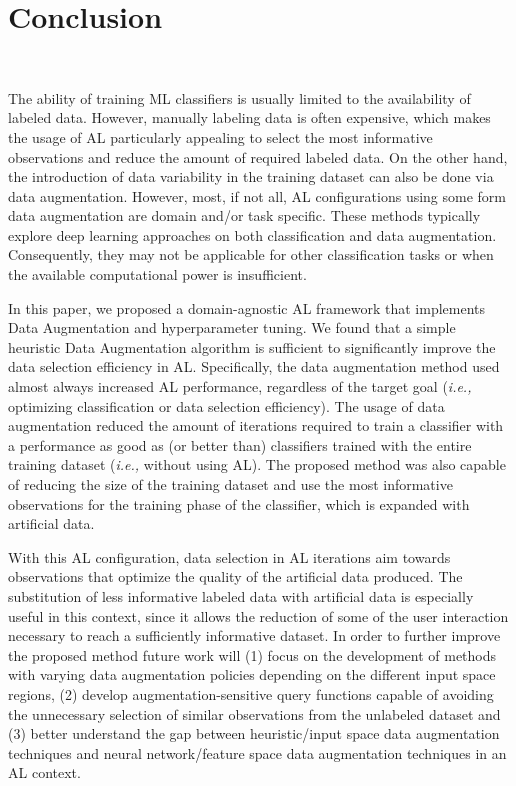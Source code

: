 \documentclass[parskip=full]{scrartcl}
\begin{document}
\section{Conclusion}~\label{sec:conclusion}

The ability of training ML classifiers is usually limited to the availability
of labeled data. However, manually labeling data is often expensive, which
makes the usage of AL particularly appealing to select the most informative
observations and reduce the amount of required labeled data. On the other
hand, the introduction of data variability in the training dataset can also be
done via data augmentation. However, most, if not all, AL configurations using
some form data augmentation are domain and/or task specific. These methods
typically explore deep learning approaches on both classification and data
augmentation. Consequently, they may not be applicable for other
classification tasks or when the available computational power is
insufficient.

In this paper, we proposed a domain-agnostic AL framework that implements Data
Augmentation and hyperparameter tuning. We found that a simple heuristic Data
Augmentation algorithm is sufficient to significantly improve the data
selection efficiency in AL\@. Specifically, the data augmentation method used
almost always increased AL performance, regardless of the target goal
(\textit{i.e.,} optimizing classification or data selection efficiency). The
usage of data augmentation reduced the amount of iterations required to train
a classifier with a performance as good as (or better than) classifiers
trained with the entire training dataset (\textit{i.e.,} without using AL).
The proposed method was also capable of reducing the size of the training
dataset and use the most informative observations for the training phase of
the classifier, which is expanded with artificial data. 

With this AL configuration, data selection in AL iterations aim towards
observations that optimize the quality of the artificial data produced. The
substitution of less informative labeled data with artificial data is
especially useful in this context, since it allows the reduction of some of
the user interaction necessary to reach a sufficiently informative dataset.
In order to further improve the proposed method future work will (1) focus on
the development of methods with varying data augmentation policies depending
on the different input space regions, (2) develop augmentation-sensitive query
functions capable of avoiding the unnecessary selection of similar
observations from the unlabeled dataset and (3) better understand the gap
between heuristic/input space data augmentation techniques and neural
network/feature space data augmentation techniques in an AL context.



\end{document}
